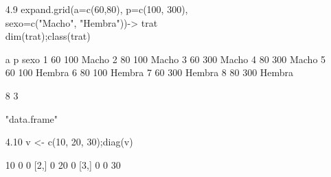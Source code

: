 \documentclass[letterpaper, 12pt]{article}
\begin{document}
\begin{enumerate}
\begin{enumerate}
\item[4.9] expand.grid(a=c(60,80), p=c(100, 300),\\
sexo=c("Macho", "Hembra"))-> trat\\
dim(trat);class(trat)

\begin{Schunk}
\begin{Soutput}
   a   p   sexo
1 60 100  Macho
2 80 100  Macho
3 60 300  Macho
4 80 300  Macho
5 60 100 Hembra
6 80 100 Hembra
7 60 300 Hembra
8 80 300 Hembra
\end{Soutput}
\begin{Soutput}
[1] 8 3
\end{Soutput}
\begin{Soutput}
[1] "data.frame"
\end{Soutput}
\end{Schunk}

\item[4.10] v <- c(10, 20, 30);diag(v)
\begin{Schunk}
\begin{Soutput}
     [,1] [,2] [,3]
[1,]   10    0    0
[2,]    0   20    0
[3,]    0    0   30
\end{Soutput}
\end{Schunk}

\end{enumerate}
\end{enumerate}
\end{document}
